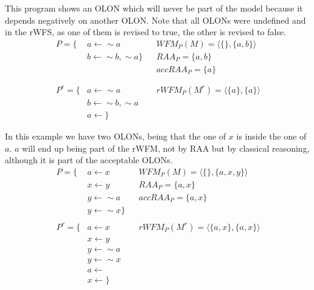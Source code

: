 \begin{example}
This program shows an OLON which will never be part of the model because it depends negatively on another OLON. Note that all OLONs were undefined and in the rWFS, as one of them is revised to true, the other is revised to false.
\begin{align*}
P=\{			& a\leftarrow\sim a					& 	& WFM_{P}(M)=\langle\{\},\{a,b\}\rangle \\
					& b\leftarrow\sim b,\sim a\}	& 	& RAA_{P}=\{a,b\}\\
					& 													& 	& accRAA_{P}=\{a\}\\
					&													  &		&  \\
					& 													&		&  \\
P^{r}=\{	& a\leftarrow\sim a					& 	& rWFM_{P}(M^{r})=\langle\{a\},\{a\}\rangle \\
					& b\leftarrow\sim b,\sim a	& 	&  \\
					& a\leftarrow 		\}				& 	&	 
\end{align*}
\end{example}



\begin{example}
In this example we have two OLONs, being that the one of $x$ is inside the one of $a$. $a$ will end up being part of the rWFM, not by RAA but by classical reasoning, although it is part of the acceptable OLONs.
\begin{align*}
P=\{			& a \leftarrow x					& 	& WFM_{P}(M)=\langle\{\},\{a,x,y\}\rangle \\
					& x \leftarrow y					& 	& RAA_{P}=\{a,x\}\\
					& y \leftarrow \sim a			& 	& accRAA_{P}=\{a,x\}\\
					& y \leftarrow \sim x	\}		&		&  \\
					& 												&		&  \\
P^{r}=\{	& a \leftarrow x					& 	& rWFM_{P}(M^{r})=\langle\{a,x\},\{a,x\}\rangle \\
					& x \leftarrow y					& 	&  \\
					& y \leftarrow \sim a			& 	&	 \\
					& y \leftarrow \sim x			&		& \\
					& a \leftarrow 						&		& \\
					& x \leftarrow 			\}			&		& 
\end{align*}
\end{example}







